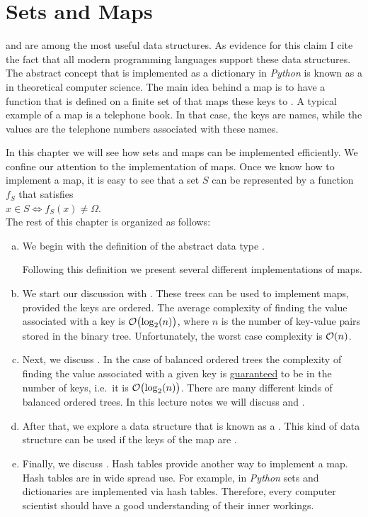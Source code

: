 \chapter{Sets and Maps}
 and  are among the most useful data structures.  As evidence for this claim I
cite the fact that all modern programming languages support these data structures.
The abstract concept that is implemented as a dictionary in \textsl{Python} is known as a 
 in theoretical computer science. 
The main idea behind a map is to have a function that is defined on a finite set of  that
maps these keys to .  A typical example of a map is a telephone book.  In that case, the keys
are names, while the values are the telephone numbers associated with these names.

In this chapter we will see how sets and maps can be implemented efficiently.  We confine our attention to the
implementation of maps.  Once we know how to implement a map, it is easy to see that a set $S$ can be
represented by a function $f_S$ that satisfies 
\\[0.2cm]
\hspace*{1.3cm}
$x \in S \Leftrightarrow f_S(x) \not= \Omega$.
\\[0.2cm]
The rest of this chapter is organized as follows:
\begin{enumerate}[(a)]
\item We begin with the definition of the abstract data type . 
    
      Following this definition we present several different implementations of maps. 
\item We start our discussion with .  These trees can be used to implement maps,
      provided the keys are ordered.  The average complexity of finding the value associated with a key
      is $\mathcal{O}\bigl(\log_2(n)\bigr)$, where $n$ is the number of key-value pairs stored in the binary tree.
      Unfortunately, the worst case complexity  is $\mathcal{O}(n)$.
\item Next, we discuss .  In the case of balanced ordered trees the
      complexity of finding the value associated with a given key is g\underline{uaranteed} to be
       in the number of keys, i.e.~it is $\mathcal{O}\bigl(\log_2(n)\bigr)$.
      There are many different kinds of balanced ordered trees.  In this lecture notes we will discuss
       and . 
\item After that, we explore a data structure that is known as a .  This kind of data structure can
      be used if the keys of the map are . 
\item Finally, we discuss .  Hash tables provide another way to implement a map.
      Hash tables are in wide spread use.  For example, in \textsl{Python} sets and dictionaries are
      implemented via hash tables.  Therefore, every computer scientist should have a good understanding of
      their inner workings. 
\end{enumerate}


